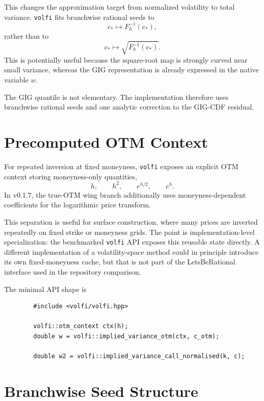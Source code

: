 \documentclass[11pt]{article}
\begin{document}
	This changes the approximation target from normalized volatility to total variance. \texttt{volfi} fits branchwise rational seeds to
	\begin{equation}
		c_* \mapsto F_h^{-1}(c_*),
	\end{equation}
	rather than to
	\begin{equation}
		c_* \mapsto \sqrt{F_h^{-1}(c_*)}.
	\end{equation}
	This is potentially useful because the square-root map is strongly curved near small variance, whereas the GIG representation is already expressed in the native variable $w$.
	
	The GIG quantile is not elementary. The implementation therefore uses branchwise rational seeds and one analytic correction to the GIG-CDF residual.
	
	\section{Precomputed OTM Context}
	
	For repeated inversion at fixed moneyness, \texttt{volfi} exposes an explicit OTM context storing moneyness-only quantities,
	\begin{equation}
		h, \qquad h^2, \qquad e^{h/2}, \qquad e^h.
	\end{equation}
	In v0.1.7, the true-OTM wing branch additionally uses moneyness-dependent coefficients for the logarithmic price transform.
	
	This separation is useful for surface construction, where many prices are inverted repeatedly on fixed strike or moneyness grids. The point is implementation-level specialization: the benchmarked \texttt{volfi} API exposes this reusable state directly. A different implementation of a volatility-space method could in principle introduce its own fixed-moneyness cache, but that is not part of the LetsBeRational interface used in the repository comparison.
	
	The minimal API shape is
	\begin{verbatim}
		#include <volfi/volfi.hpp>
		
		volfi::otm_context ctx(h);
		double w = volfi::implied_variance_otm(ctx, c_otm);
		
		double w2 = volfi::implied_variance_call_normalised(k, c);
	\end{verbatim}
	
	\section{Branchwise Seed Structure}
	
\end{document}
